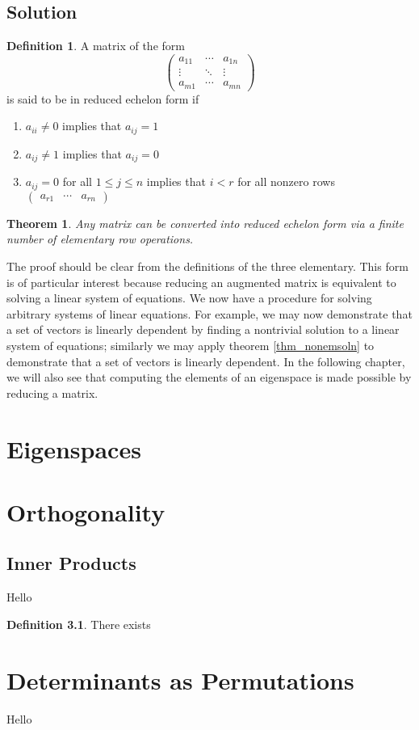 \documentclass[oneside, 12pt]{book}
\newtheorem{thm}{Theorem}[section]
\theoremstyle{definition}
\newtheorem{defn}{Definition}[section]
\begin{document}
\section{Solution}
\begin{defn}
\label{defn_rref}
A matrix of the form \[\begin{pmatrix} a_{11} & \cdots & a_{1n}\\ \vdots & \ddots & \vdots \\a_{m1} & \cdots & a_{mn}\end{pmatrix}\] is said to be in reduced echelon form if
\begin{enumerate}
  \item $a_{ii}\neq 0$ implies that $a_{ij}=1$
  \item $a_{ij} \neq 1$ implies that $a_{ij}=0$
  \item $a_{ij}=0$ for all $1\leq j \leq n$ implies that $i < r$ for all nonzero rows $\begin{pmatrix}a_{r1} & \cdots & a_{rn}\end{pmatrix}$
\end{enumerate}
\end{defn}
\begin{thm}
\label{thm_rref}
Any matrix can be converted into reduced echelon form via a finite number of elementary row operations.
\end{thm}
The proof should be clear from the definitions of the three elementary.
This form is of particular interest because reducing an augmented matrix is equivalent to solving a linear system of equations. We now have a
procedure for solving arbitrary systems of linear equations. For example, we may now demonstrate that a set of vectors is linearly dependent by
finding a nontrivial solution to a linear system of equations; similarly we may apply theorem \ref{thm_nonemsoln} to demonstrate that a set of vectors is linearly dependent. In the following chapter, we will also see that computing the elements of an eigenspace is made possible by reducing a matrix.
\chapter{Eigenspaces}
\chapter{Orthogonality}
\section{Inner Products}
Hello
\begin{defn}
  There exists
\end{defn}
\appendix
\chapter{Determinants as Permutations}
Hello
\end{document}
